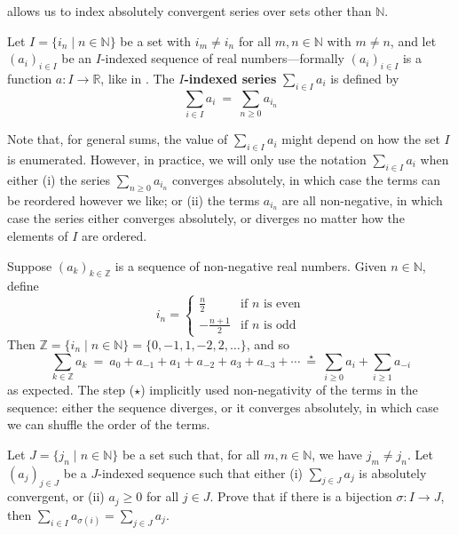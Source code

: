  allows us to index absolutely convergent series over sets other than $\mathbb{N}$.

\begin{definition}
\label{defSumOverCountablyInfiniteSet}
Let $I = \{ i_n \mid n \in \mathbb{N} \}$ be a set with $i_m \ne i_n$ for all $m,n \in \mathbb{N}$ with $m \ne n$, and let $(a_i)_{i \in I}$ be an $I$-indexed sequence of real numbers---formally $(a_i)_{i \in I}$ is a function $a : I \to \mathbb{R}$, like in . The \textbf{$I$-indexed series} $\displaystyle \sum_{i \in I} a_i$ is defined by
\[ \sum_{i \in I} a_i ~=~ \sum_{n \ge 0} a_{i_n} \]
\end{definition}

Note that, for general sums, the value of $\sum_{i \in I} a_i$ might depend on how the set $I$ is enumerated. However, in practice, we will only use the notation $\sum_{i \in I} a_i$ when either (i) the series $\sum_{n \ge 0} a_{i_n}$ converges absolutely, in which case the terms can be reordered however we like; or (ii) the terms $a_{i_n}$ are all non-negative, in which case the series either converges absolutely, or diverges no matter how the elements of $I$ are ordered.

\begin{example}
Suppose $(a_k)_{k \in \mathbb{Z}}$ is a sequence of non-negative real numbers. Given $n \in \mathbb{N}$, define
\[ i_n = \begin{cases} \frac{n}{2} & \text{if $n$ is even} \\ -\frac{n+1}{2} & \text{if $n$ is odd} \end{cases} \]
Then $\mathbb{Z} = \{ i_n \mid n \in \mathbb{N} \} = \{ 0,{-1},1,{-2},2,\dots{} \}$, and so
\[ \sum_{k \in \mathbb{Z}} a_k ~=~ a_0 + a_{-1} + a_1 + a_{-2} + a_3 + a_{-3} + \cdots ~\overset{\star}{=}~ \sum_{i \ge 0} a_i + \sum_{i \ge 1} a_{-i} \]
as expected. The step ($\star$) implicitly used non-negativity of the terms in the sequence: either the sequence diverges, or it converges absolutely, in which case we can shuffle the order of the terms.
\end{example}

\begin{exercise}
Let $J = \{ j_n \mid n \in \mathbb{N} \}$ be a set such that, for all $m,n \in \mathbb{N}$, we have $j_m \ne j_n$. Let $(a_j)_{j \in J}$ be a $J$-indexed sequence such that either (i) $\sum_{j \in J} a_j$ is absolutely convergent, or (ii) $a_j \ge 0$ for all $j \in J$. Prove that if there is a bijection $\sigma : I \to J$, then $\sum_{i \in I} a_{\sigma(i)} = \sum_{j \in J} a_j$.
\end{exercise}

